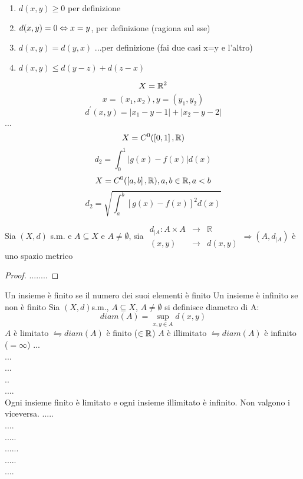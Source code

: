	\begin{enumerate}
		\item $d(x,y)\ge 0$ per definizione
		\item $d(x,y)=0\Leftrightarrow x=y$, per definizione (ragiona sul sse) 
		\item $d(x,y)=d(y,x)$ ...per definizione (fai due casi x=y e l'altro)
		\item $d(x,y)\le d(y-z)+d(z-x)$ 
	\end{enumerate}
\example
$$X=\mathbb{R}^{2}$$
$$x=(x_1,x_2), y=(y_1,y_2)$$
$$d^{'}(x,y)=\left| x_1-y-1 \right|+\left|x_2-y-2\right|$$
...\\

\example
\example
$$X=C^0(\left[0,1\right],\mathbb{R})$$
$$d_2=\int_0^1\left|g(x)-f(x)\right|d(x)$$
\example
$$X=C^0(\left[a,b\right],\mathbb{R}), a,b\in\mathbb{R}, a<b$$
$$d_2=\sqrt{\int_a^b\left[g(x)-f(x)\right]^2d(x)}$$

\proposition
Sia $(X,d)$ s.m. e $A\subseteq X$ e $A\ne \emptyset$, sia $\begin{array}{rcl} d_{|A} : A\times A & \to & \mathbb{R} \\ (x,y) & \to & d(x,y) \end{array} \Rightarrow (A,d_{|A})$ è uno spazio metrico
\begin{proof}
	........
\end{proof}

Un insieme è finito se il numero dei suoi elementi è finito
Un insieme è infinito se non è finito
Sia $(X,d)$s.m., $A\subseteq X$, $A\ne \emptyset$ si definisce diametro di A: $$diam(A)=\sup\limits_{x,y\in A}d(x,y)$$
$A$ è limitato $\leftrightharpoons diam(A)$ è finito ($\in\mathbb{R}$)
$A$ è illimitato $\leftrightharpoons diam(A)$ è infinito ($=\infty$)
\example
...\\
...\\
...\\
..\\
....\\
\observation
Ogni insieme finito è limitato e ogni insieme illimitato è infinito. Non valgono i viceversa.
\example 
.....\\
....\\
.....\\
......\\
.....\\
....\\

